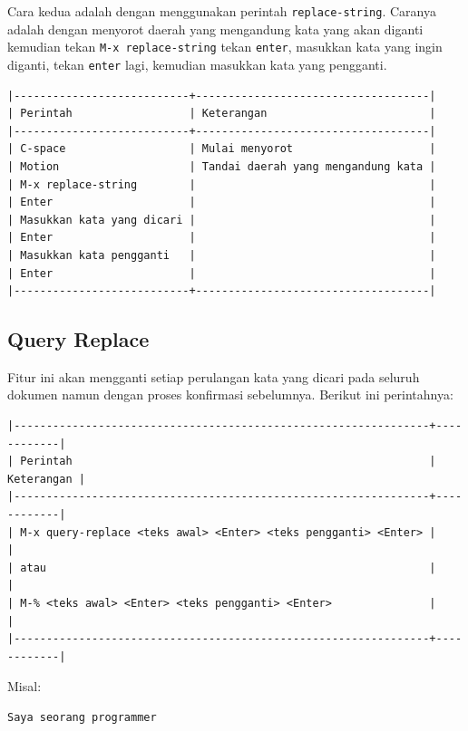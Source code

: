 \documentclass{article}
\begin{document}
Cara kedua adalah dengan menggunakan perintah \verb=replace-string=.
Caranya adalah dengan menyorot daerah yang mengandung kata yang akan diganti
kemudian tekan \verb=M-x replace-string= tekan \verb=enter=, masukkan kata
yang ingin diganti, tekan \verb=enter= lagi, kemudian masukkan kata yang
pengganti.

\begin{verbatim}
|---------------------------+------------------------------------|
| Perintah                  | Keterangan                         |
|---------------------------+------------------------------------|
| C-space                   | Mulai menyorot                     |
| Motion                    | Tandai daerah yang mengandung kata |
| M-x replace-string        |                                    |
| Enter                     |                                    |
| Masukkan kata yang dicari |                                    |
| Enter                     |                                    |
| Masukkan kata pengganti   |                                    |
| Enter                     |                                    |
|---------------------------+------------------------------------|
\end{verbatim}

\subsection{Query Replace}
Fitur ini akan mengganti setiap perulangan kata yang dicari pada seluruh dokumen
namun dengan proses konfirmasi sebelumnya. Berikut ini perintahnya:

\begin{verbatim}
|----------------------------------------------------------------+------------|
| Perintah                                                       | Keterangan |
|----------------------------------------------------------------+------------|
| M-x query-replace <teks awal> <Enter> <teks pengganti> <Enter> |            |
| atau                                                           |            |
| M-% <teks awal> <Enter> <teks pengganti> <Enter>               |            |
|----------------------------------------------------------------+------------|
\end{verbatim}

Misal:

\begin{verbatim}
Saya seorang programmer
\end{verbatim}
\end{document}
